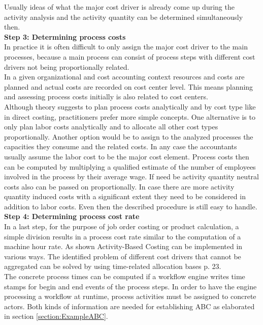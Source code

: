 Usually ideas of what the major cost driver is already come up during the activity analysis and the activity quantity can be determined simultaneously then.
\\
\newline
\textbf{Step 3: Determining process costs}
\\
In practice it is often difficult to only assign the major cost driver to the main processes, because a main process can consist of process steps with different cost drivers not being proportionally related.
\\
In a given organizational and cost accounting context resources and costs are planned and actual costs are recorded on cost center level. This means planning and assessing process costs initially is also related to cost centers.
\\
Although theory suggests to plan process costs analytically and by cost type like in direct costing, practitioners prefer more simple concepts. One alternative is to only plan labor costs analytically and to allocate all other cost types proportionally. Another option would be to assign to the analyzed processes the capacities they consume and the related costs. In any case the accountants usually assume the labor cost to be the major cost element. Process costs then can be computed by multiplying a qualified estimate of the number of employees involved in the process by their average wage. If need be activity quantity neutral costs also can be passed on proportionally. In case there are more activity quantity induced costs with a significant extent they need to be considered in addition to labor costs. Even then the described procedure is still easy to handle.
\\
\newline
\textbf{Step 4: Determining process cost rate}
\\
In a last step, for the purpose of job order costing or product calculation, a simple division results in a process cost rate similar to the computation of a machine hour rate.
As shown Activity-Based Costing can be implemented in various ways. The identified problem of different cost drivers that cannot be aggregated can be solved by using time-related allocation bases \cite{article:Rechenzwecke} p. 23.
\\
The concrete process times can be computed if a workflow engine writes time stamps for begin and end events of the process steps. In order to have the engine processing a workflow at runtime, process activities must be assigned to concrete actors. Both kinds of information are needed for establishing ABC as elaborated in section \ref{section:ExampleABC}.


